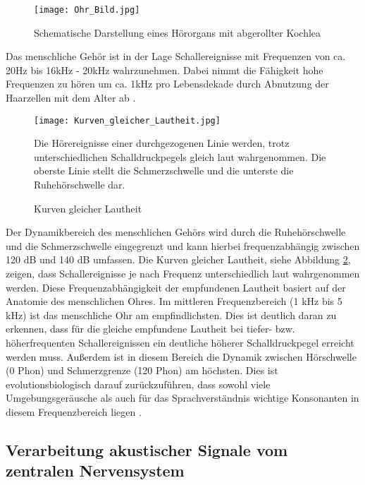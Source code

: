 \begin{figure}[H]
\centering
\texttt{[image: Ohr\_Bild.jpg]}
\caption{Schematische Darstellung eines Hörorgans mit abgerollter Kochlea}
\label{fig:Ohr_Bild}
\end{figure}


Das menschliche Gehör ist in der Lage Schallereignisse mit Frequenzen von ca. 20Hz bis 16kHz - 20kHz wahrzunehmen. Dabei nimmt die Fähigkeit hohe Frequenzen zu hören um ca. 1kHz pro Lebensdekade durch Abnutzung der Haarzellen mit dem Alter ab \cite[S.41]{Genuit10}.  \\

\begin{figure}[H]
\centering
\texttt{[image: Kurven\_gleicher\_Lautheit.jpg]}
\caption{Kurven gleicher Lautheit}
Die Hörereignisse einer durchgezogenen Linie werden, trotz unterschiedlichen Schalldruckpegels gleich laut wahrgenommen. Die oberste Linie stellt die Schmerzschwelle und die unterste die Ruhehörschwelle dar.
\label{fig:Kurven_gleicher_Lautheit}
\end{figure}

Der Dynamikbereich des menschlichen Gehörs wird durch die Ruhehörschwelle und die Schmerzschwelle eingegrenzt und kann hierbei frequenzabhängig zwischen 120 dB und 140 dB umfassen. Die Kurven gleicher Lautheit, siehe Abbildung \ref{fig:Kurven_gleicher_Lautheit}, zeigen, dass Schallereignisse je nach Frequenz unterschiedlich laut wahrgenommen werden. Diese Frequenzabhängigkeit der empfundenen Lautheit basiert auf der Anatomie des menschlichen Ohres. Im mittleren Frequenzbereich (1 kHz bis 5 kHz) ist das menschliche Ohr am empfindlichsten. Dies ist deutlich daran zu erkennen, dass für die gleiche empfundene Lautheit bei tiefer- bzw. höherfrequenten Schallereignissen ein deutliche höherer Schalldruckpegel erreicht werden muss. Außerdem ist in diesem Bereich die Dynamik zwischen Hörschwelle (0 Phon) und Schmerzgrenze (120 Phon) am höchsten. Dies ist evolutionsbiologisch darauf zurückzuführen, dass sowohl viele Umgebungsgeräusche als auch für das Sprachverständnis wichtige Konsonanten in diesem Frequenzbereich liegen \cite[S.47]{HdA08}. 

\subsection{Verarbeitung akustischer Signale vom zentralen Nervensystem}

